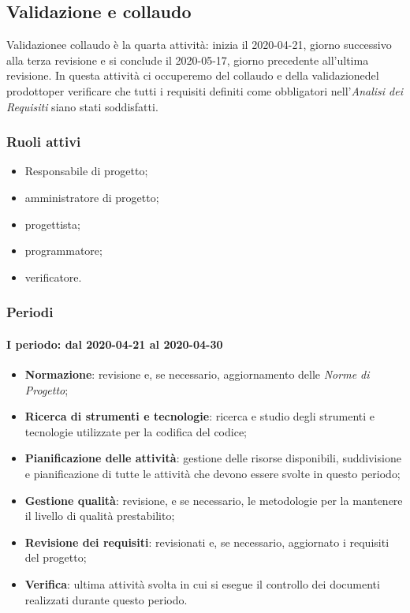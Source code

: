 \subsection{Validazione e collaudo}
Validazione\glosp e collaudo è la quarta attività: inizia il 2020-04-21, giorno successivo alla terza revisione e si conclude il 2020-05-17, giorno precedente all'ultima revisione. In questa attività ci occuperemo del collaudo e della validazione\glosp del prodotto\glosp per verificare che tutti i requisiti definiti come obbligatori nell'\textit{Analisi dei Requisiti} siano stati soddisfatti.

\subsubsection{Ruoli attivi}
\begin{itemize}
	\item Responsabile di progetto\glo;
	\item amministratore di progetto\glo;
	\item progettista;
	\item programmatore;
	\item verificatore.
\end{itemize}

\subsubsection{Periodi}
\paragraph*{I periodo: dal 2020-04-21 al 2020-04-30}
\begin{itemize}
	\item \textbf{Normazione}: revisione e, se necessario, aggiornamento delle \textit{Norme di Progetto};
	\item \textbf{Ricerca di strumenti e tecnologie}: ricerca e studio degli strumenti e tecnologie utilizzate per la codifica del codice;
	\item \textbf{Pianificazione delle attività}: gestione delle risorse disponibili, suddivisione e pianificazione di tutte le attività che devono essere svolte in questo periodo;
	\item \textbf{Gestione qualità}: revisione, e se necessario, le metodologie per la mantenere il livello di qualità prestabilito;
	\item \textbf{Revisione dei requisiti}: revisionati e, se necessario, aggiornato i requisiti del progetto\glo;
	\item \textbf{Verifica}: ultima attività svolta in cui si esegue il controllo dei documenti realizzati durante questo periodo.
\end{itemize}


